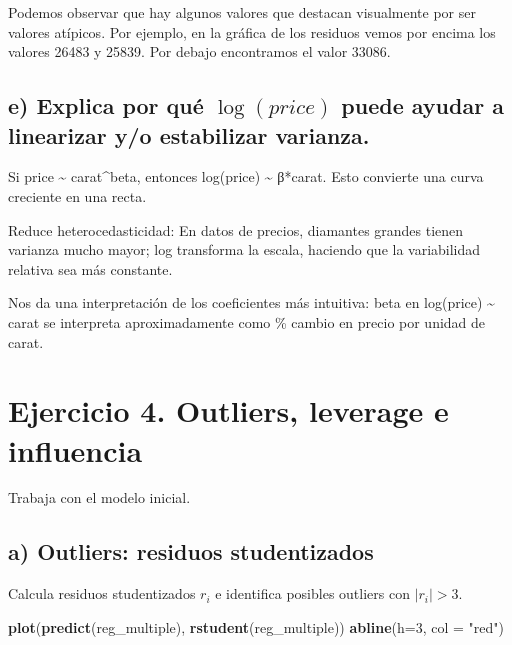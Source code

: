 \documentclass[
  spanish,
]{article}
\newenvironment{Shaded}{\begin{snugshade}}{\end{snugshade}}
\newcommand{\AttributeTok}[1]{\textcolor[rgb]{0.13,0.29,0.53}{#1}}
\newcommand{\DecValTok}[1]{\textcolor[rgb]{0.00,0.00,0.81}{#1}}
\newcommand{\FunctionTok}[1]{\textcolor[rgb]{0.13,0.29,0.53}{\textbf{#1}}}
\newcommand{\NormalTok}[1]{#1}
\newcommand{\StringTok}[1]{\textcolor[rgb]{0.31,0.60,0.02}{#1}}
\begin{document}
Podemos observar que hay algunos valores que destacan visualmente por
ser valores atípicos. Por ejemplo, en la gráfica de los residuos vemos
por encima los valores 26483 y 25839. Por debajo encontramos el valor
33086.

\subsection*{\texorpdfstring{e) Explica por qué \(\log(price)\) puede
ayudar a linearizar y/o estabilizar
varianza.}{e) Explica por qué \textbackslash log(price) puede ayudar a linearizar y/o estabilizar varianza.}}\label{e-explica-por-quuxe9-logprice-puede-ayudar-a-linearizar-yo-estabilizar-varianza.}

Si price \textasciitilde{} carat\^{}beta, entonces log(price)
\textasciitilde{} β*carat. Esto convierte una curva creciente en una
recta.

Reduce heterocedasticidad: En datos de precios, diamantes grandes tienen
varianza mucho mayor; log transforma la escala, haciendo que la
variabilidad relativa sea más constante.

Nos da una interpretación de los coeficientes más intuitiva: beta en
log(price) \textasciitilde{} carat se interpreta aproximadamente como \%
cambio en precio por unidad de carat.

\section*{Ejercicio 4. Outliers, leverage e
influencia}\label{ejercicio-4.-outliers-leverage-e-influencia}

Trabaja con el modelo inicial.

\subsection*{a) Outliers: residuos
studentizados}\label{a-outliers-residuos-studentizados}

Calcula residuos studentizados \(r_i\) e identifica posibles outliers
con \(|r_i| > 3\).

\begin{Shaded}
\begin{Highlighting}[]
\FunctionTok{plot}\NormalTok{(}\FunctionTok{predict}\NormalTok{(reg\_multiple), }\FunctionTok{rstudent}\NormalTok{(reg\_multiple))}
\FunctionTok{abline}\NormalTok{(}\AttributeTok{h=}\DecValTok{3}\NormalTok{, }\AttributeTok{col =} \StringTok{"red"}\NormalTok{)}
\end{Highlighting}
\end{Shaded}
\end{document}

